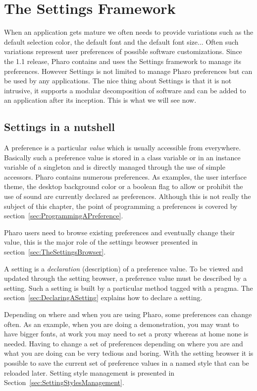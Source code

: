 \documentclass[a4paper,10pt,twoside]{book}
\begin{document}
\fi
\sloppy
\chapter{The Settings Framework}

When an application gets mature we often needs to provide variations such as the default selection color, the default font and the default font size... Often such variations represent user preferences of possible software customizations. 
Since the 1.1 release, Pharo contains and uses the Settings framework to manage its preferences. However Settings is not limited to manage Pharo preferences but can be used by any applications. The nice thing about Settings is that it is 
not intrusive, it supports a modular decomposition of software and can be added to an application after its inception. 
This is what we will see now.

\section{Settings in a nutshell}
A preference is a particular \emph{value} which is usually accessible from everywhere. Basically such a preference value is stored in a class variable or in an instance variable of a singleton and is directly managed through the use of simple accessors. Pharo contains numerous preferences. As examples, the user interface theme, the desktop background color or a boolean flag to allow or prohibit the use of sound are currently declared as preferences. Although this is not really the subject of this chapter, the point of programming a preferences is covered by section~\ref{sec:ProgrammingAPreference}. 

Pharo users need to browse existing preferences and eventually change their value, this is the major role of the settings browser presented in section~\ref{sec:TheSettingsBrowser}.

A setting is a \emph{declaration} (description) of a preference value. To be viewed and updated through the setting browser, a preference value must be described by a setting. Such a setting is built by a particular method tagged with a pragma. The section~\ref{sec:DeclaringASetting} explains how to declare a setting.

Depending on where and when you are using Pharo, some preferences can change often. As an example, when you are doing a demonstration, you may want to have bigger fonts, at work you may need to set a proxy whereas at home none is needed. Having to change a set of preferences depending on where you are and what you are doing can be very tedious and boring. With the setting browser it is possible to save the current set of preference values in a named style that can be reloaded later. Setting style management is presented in Section~\ref{sec:SettingStylesManagement}.
\end{document}
